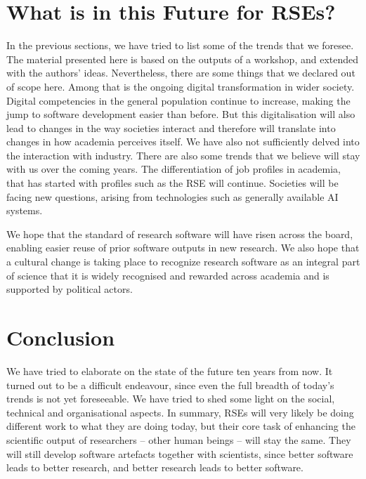 \documentclass{eceasst}
\begin{document}
\section{What is in this Future for RSEs?}
In the previous sections, we have tried to list some of the trends that we foresee.
The material presented here is based on the outputs of a workshop, and extended with the authors' ideas.
Nevertheless, there are some things that we declared out of scope here.
Among that is the ongoing digital transformation in wider society.
Digital competencies in the general population continue to increase,
making the jump to software development easier than before.
But this digitalisation will also lead to changes in the way societies
interact and therefore will translate into changes in how academia perceives itself.
We have also not sufficiently delved into the interaction with industry.
There are also some trends that we believe will stay with us over the coming years.
The differentiation of job profiles in academia, that has started with profiles such as the RSE will continue.
Societies will be facing new questions, arising from technologies such as generally available AI systems.

We hope that the standard of research software will have risen across the board,
enabling easier reuse of prior software outputs in new research.
We also hope that a cultural change is taking place to recognize research software
as an integral part of science that it is widely recognised and rewarded across
academia and is supported by political actors.

\section{Conclusion}
We have tried to elaborate on the state of the future ten years from now.
It turned out to be a difficult endeavour, since even the full breadth of today's trends is not yet foreseeable.
We have tried to shed some light on the social, technical and organisational aspects.
In summary, RSEs will very likely be doing different work to what they are doing today,
but their core task of enhancing the scientific output of researchers -- other human
beings -- will stay the same.
They will still develop software artefacts together with scientists,
since better software leads to better research,
and better research leads to better software.
\end{document}
